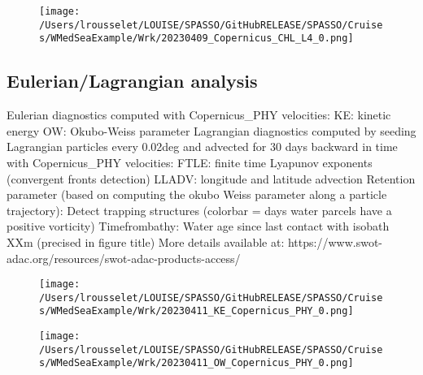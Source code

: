 \documentclass{article}%
\begin{document}
\begin{figure}[h!]%
\centering%
\texttt{[image: /Users/lrousselet/LOUISE/SPASSO/GitHubRELEASE/SPASSO/Cruises/WMedSeaExample/Wrk/20230409\_Copernicus\_CHL\_L4\_0.png]}%
\end{figure}

%
\clearpage

%
\subsection{Eulerian/Lagrangian analysis}%
\label{subsec:Eulerian/Lagrangiananalysis}%
Eulerian diagnostics computed with Copernicus\_PHY velocities:\newline%
 KE: kinetic energy \newline%
 OW: Okubo{-}Weiss parameter\newline%
\newline%
%
 Lagrangian diagnostics computed by seeding Lagrangian particles every 0.02deg and advected for 30 days backward in time with Copernicus\_PHY velocities:\newline%
FTLE: finite time Lyapunov exponents (convergent fronts detection)\newline%
LLADV: longitude and latitude advection\newline%
Retention parameter (based on computing the okubo Weiss parameter along a particle trajectory): Detect trapping structures (colorbar = days water parcels have a positive vorticity)\newline%
Timefrombathy: Water age since last contact with isobath XXm (precised in figure title)\newline%
\newline%
More details available at: https://www.swot{-}adac.org/resources/swot{-}adac{-}products{-}access/ \newline%
\newline%
%


\begin{figure}[h!]%
\centering%
\texttt{[image: /Users/lrousselet/LOUISE/SPASSO/GitHubRELEASE/SPASSO/Cruises/WMedSeaExample/Wrk/20230411\_KE\_Copernicus\_PHY\_0.png]}%
\end{figure}

%


\begin{figure}[h!]%
\centering%
\texttt{[image: /Users/lrousselet/LOUISE/SPASSO/GitHubRELEASE/SPASSO/Cruises/WMedSeaExample/Wrk/20230411\_OW\_Copernicus\_PHY\_0.png]}%
\end{figure}
\end{document}
